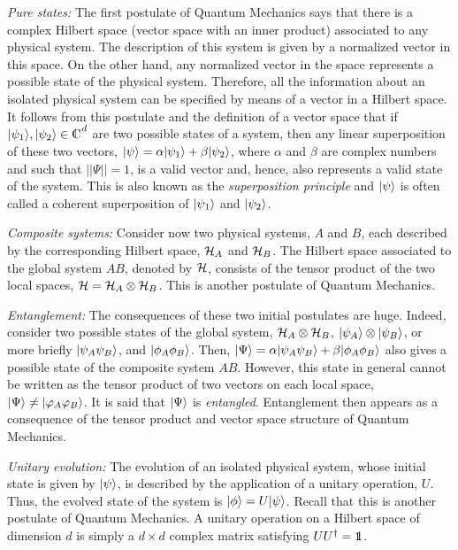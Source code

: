 \documentclass[a4paper]{article}
\def\H{{\cal H}}
\def\one{\leavevmode\hbox{\small1\normalsize\kern-.33em1}}
\def\compl{\begin{picture}(8,8)\put(0,0){C}\put(3,0.3){\line(0,1){7}}\end{picture}}
\begin{document}
{\sl Pure states:} The first postulate of Quantum Mechanics says
that there is a complex Hilbert space (vector space with an inner
product) associated to any physical system. The
description of this system is given by a normalized vector in this
space. On the other hand, any normalized vector in the space represents a possible state of the physical system. 
Therefore, all the information
about an isolated physical system can be specified by means of a vector
in a Hilbert space.
It follows from this postulate and the definition of a
vector space that if $\ket{\psi_1},\ket{\psi_2}\in\compl^d$ are
two possible states of a system, then any linear superposition of
these two vectors, $|\psi\rangle=\alpha|\psi_1\rangle+\beta|\psi_2\rangle$,
where $\alpha$ and $\beta$ are complex numbers and such that
$||\Psi||=1$, is a valid vector and, hence, also represents a valid state of the system.
This is also known as the \emph{superposition principle} and
$|\psi\rangle$ is often called a coherent superposition of
$|\psi_1\rangle$ and $|\psi_2\rangle$. 

{\sl Composite systems:} Consider now two physical systems, $A$ and
$B$, each described by the corresponding Hilbert space, $\H_A$ and
$\H_B$. The Hilbert space associated to the global system $AB$,
denoted by $\H$, consists of the tensor product of the two local
spaces, $\H=\H_A\otimes \H_B$. This is another postulate of Quantum
Mechanics. 

{\sl Entanglement:} The consequences of these two initial postulates
 are huge.
Indeed, consider two possible states of the global system,
$\H_A\otimes\H_B$, $|\psi_A\rangle\otimes|\psi_B\rangle$, or more
briefly $|\psi_A\psi_B\rangle$, and $|\phi_A\phi_B\rangle$. Then,
$|\Psi\rangle=\alpha|\psi_A\psi_B\rangle+\beta|\phi_A\phi_B\rangle$ also
gives a possible state of the composite system $AB$. However, this
state in general cannot be written as the tensor product of two
vectors on each local space, $|\Psi\rangle\neq
|\varphi_A\varphi_B\rangle$. It is said that $|\Psi\rangle$ is
\emph{entangled}. Entanglement then appears as a consequence of
the tensor product and vector space structure of Quantum
Mechanics. 

{\sl Unitary evolution:} The evolution of an isolated physical
system, whose initial state is given by $|\psi\rangle$, is described
by the application of a unitary operation, $U$. Thus, the evolved
state of the system is $|\phi\rangle=U|\psi\rangle$. Recall that this
is another postulate of Quantum Mechanics. A unitary operation on
a Hilbert space of dimension $d$ is simply a $d\times d$ complex matrix
satisfying $U U^\dagger=\one$.
\end{document}
